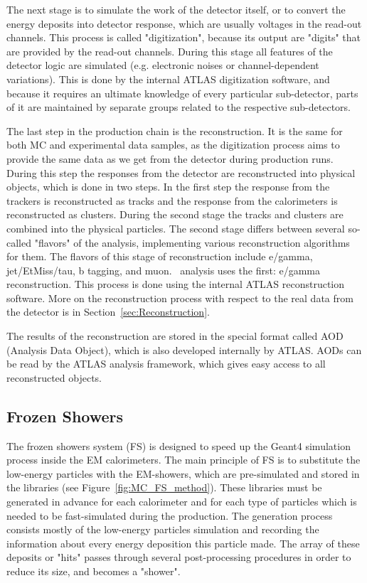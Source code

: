 The next stage is to simulate the work of the detector itself, or to convert the energy deposits into detector response, which are usually voltages in the read-out channels. This process is called "digitization", because its output are "digits" that are provided by the read-out channels. During this stage all features of the detector logic are simulated (e.g. electronic noises or channel-dependent variations). This is done by the internal ATLAS digitization software, and because it requires an ultimate knowledge of every particular sub-detector, parts of it are maintained by separate groups related to the respective sub-detectors.

The last step in the production chain is the reconstruction. It is the same for both MC and experimental data samples, as the digitization process aims to provide the same data as we get from the detector during production runs. During this step the responses from the detector are reconstructed into physical objects, which is done in two steps. In the first step the response from the trackers is reconstructed as tracks and the response from the calorimeters is reconstructed as clusters. During the second stage the tracks and clusters are combined into the physical particles. The second stage differs between several so-called "flavors" of the analysis, implementing various reconstruction algorithms for them. The flavors of this stage of reconstruction include e/gamma, jet/EtMiss/tau, b tagging, and muon. \Zee\ analysis uses the first: e/gamma reconstruction. This process is done using the internal ATLAS reconstruction software. More on the reconstruction process with respect to the real data from the detector is in Section~\ref{sec:Reconstruction}.

The results of the reconstruction are stored in the special format called AOD (Analysis Data Object), which is also developed internally by ATLAS. AODs can be read by the ATLAS analysis framework, which gives easy access to all reconstructed objects.

\subsection{Frozen Showers}
\label{sec:MC_FS}
The frozen showers system (FS) is designed to speed up the Geant4 simulation process inside the EM calorimeters. The main principle of FS is to substitute the low-energy particles with the EM-showers, which are pre-simulated and stored in the libraries (see Figure~\ref{fig:MC_FS_method}). These libraries must be generated in advance for each calorimeter and for each type of particles which is needed to be fast-simulated during the production. The generation process consists mostly of the low-energy particles simulation and recording the information about every energy deposition this particle made. The array of these deposits or "hits" passes through several post-processing procedures in order to reduce its size, and becomes a "shower".

